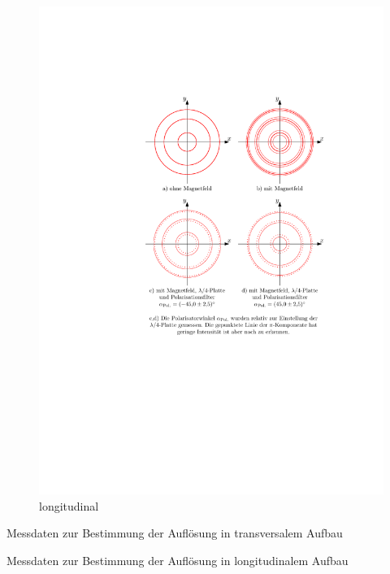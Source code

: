 \documentclass[11pt, a4paper]{article}
\begin{document}
\begin{figure}[h]
	\centering
	\includegraphics[width=1.0\textwidth]{./figures/zeeman_longitudinal.pdf}
	\caption{longitudinal}
	\label{fig:zeeman_longitudinal}
\end{figure}

\begin{table}
	\centering
	
	\caption{Messdaten zur Bestimmung der Auflösung in transversalem Aufbau}
	\label{tab:aufloesung_transversal}
\end{table}

\begin{table}
	\centering
	
	\caption{Messdaten zur Bestimmung der Auflösung in longitudinalem Aufbau}
	\label{tab:aufloesung_longitudinal}
\end{table}
\end{document}
